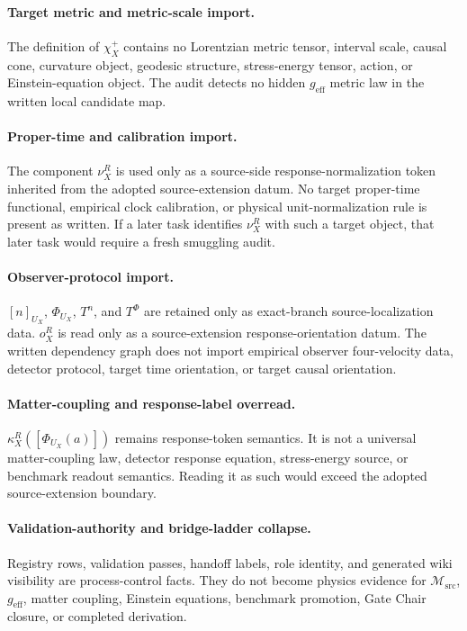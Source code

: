 \documentclass[11pt]{article}
\newcommand{\Msrc}{\mathcal{M}_{\mathrm{src}}}
\newcommand{\geff}{g_{\mathrm{eff}}}
\newcommand{\PhiU}{\Phi_{U_X}}
\begin{document}
\paragraph{Target metric and metric-scale import.}
The definition of \(\chi_X^+\) contains no Lorentzian metric tensor, interval
scale, causal cone, curvature object, geodesic structure, stress-energy tensor,
action, or Einstein-equation object. The audit detects no hidden \(\geff\)
metric law in the written local candidate map.

\paragraph{Proper-time and calibration import.}
The component \(\nu_X^R\) is used only as a source-side response-normalization
token inherited from the adopted source-extension datum. No target proper-time
functional, empirical clock calibration, or physical unit-normalization rule is
present as written. If a later task identifies \(\nu_X^R\) with such a target
object, that later task would require a fresh smuggling audit.

\paragraph{Observer-protocol import.}
\([n]_{U_X}\), \(\PhiU\), \(T^n\), and \(T^\Phi\) are retained only as
exact-branch source-localization data. \(o_X^R\) is read only as a
source-extension response-orientation datum. The written dependency graph does
not import empirical observer four-velocity data, detector protocol, target
time orientation, or target causal orientation.

\paragraph{Matter-coupling and response-label overread.}
\(\kappa_X^R([\PhiU(a)])\) remains response-token semantics. It is not a
universal matter-coupling law, detector response equation, stress-energy
source, or benchmark readout semantics. Reading it as such would exceed the
adopted source-extension boundary.

\paragraph{Validation-authority and bridge-ladder collapse.}
Registry rows, validation passes, handoff labels, role identity, and generated
wiki visibility are process-control facts. They do not become physics evidence
for \(\Msrc\), \(\geff\), matter coupling, Einstein equations, benchmark
promotion, Gate Chair closure, or completed derivation.
\end{document}
